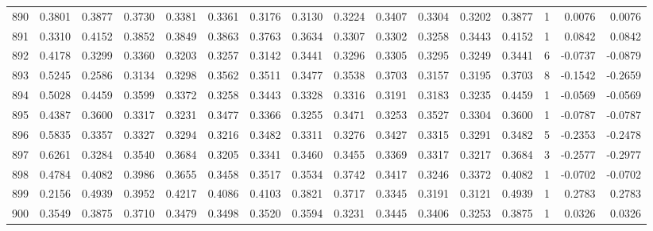 \begin{tabular}{lrrrrrrrrrrrrrrr}
890 &      0.3801 &  0.3877 &  0.3730 &  0.3381 &  0.3361 &  0.3176 &  0.3130 &  0.3224 &  0.3407 &  0.3304 &   0.3202 &     0.3877 &      1 &                    0.0076 &                     0.0076 \\
891 &      0.3310 &  0.4152 &  0.3852 &  0.3849 &  0.3863 &  0.3763 &  0.3634 &  0.3307 &  0.3302 &  0.3258 &   0.3443 &     0.4152 &      1 &                    0.0842 &                     0.0842 \\
892 &      0.4178 &  0.3299 &  0.3360 &  0.3203 &  0.3257 &  0.3142 &  0.3441 &  0.3296 &  0.3305 &  0.3295 &   0.3249 &     0.3441 &      6 &                   -0.0737 &                    -0.0879 \\
893 &      0.5245 &  0.2586 &  0.3134 &  0.3298 &  0.3562 &  0.3511 &  0.3477 &  0.3538 &  0.3703 &  0.3157 &   0.3195 &     0.3703 &      8 &                   -0.1542 &                    -0.2659 \\
894 &      0.5028 &  0.4459 &  0.3599 &  0.3372 &  0.3258 &  0.3443 &  0.3328 &  0.3316 &  0.3191 &  0.3183 &   0.3235 &     0.4459 &      1 &                   -0.0569 &                    -0.0569 \\
895 &      0.4387 &  0.3600 &  0.3317 &  0.3231 &  0.3477 &  0.3366 &  0.3255 &  0.3471 &  0.3253 &  0.3527 &   0.3304 &     0.3600 &      1 &                   -0.0787 &                    -0.0787 \\
896 &      0.5835 &  0.3357 &  0.3327 &  0.3294 &  0.3216 &  0.3482 &  0.3311 &  0.3276 &  0.3427 &  0.3315 &   0.3291 &     0.3482 &      5 &                   -0.2353 &                    -0.2478 \\
897 &      0.6261 &  0.3284 &  0.3540 &  0.3684 &  0.3205 &  0.3341 &  0.3460 &  0.3455 &  0.3369 &  0.3317 &   0.3217 &     0.3684 &      3 &                   -0.2577 &                    -0.2977 \\
898 &      0.4784 &  0.4082 &  0.3986 &  0.3655 &  0.3458 &  0.3517 &  0.3534 &  0.3742 &  0.3417 &  0.3246 &   0.3372 &     0.4082 &      1 &                   -0.0702 &                    -0.0702 \\
899 &      0.2156 &  0.4939 &  0.3952 &  0.4217 &  0.4086 &  0.4103 &  0.3821 &  0.3717 &  0.3345 &  0.3191 &   0.3121 &     0.4939 &      1 &                    0.2783 &                     0.2783 \\
900 &      0.3549 &  0.3875 &  0.3710 &  0.3479 &  0.3498 &  0.3520 &  0.3594 &  0.3231 &  0.3445 &  0.3406 &   0.3253 &     0.3875 &      1 &                    0.0326 &                     0.0326 \\

\end{tabular}
